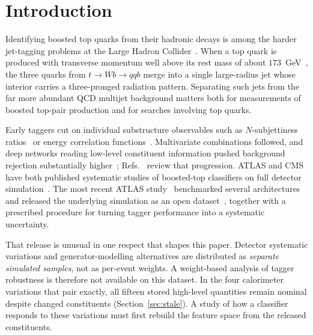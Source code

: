 \documentclass[pdflatex,sn-mathphys,Numbered,iicol]{sn-jnl}
\begin{document}
\maketitle

\section{Introduction}
\label{sec:intro}

Identifying boosted top quarks from their hadronic decays is among the harder
jet-tagging problems at the Large Hadron Collider~\cite{Evans2008}. When a top quark is
produced with transverse momentum well above its rest mass of about
$173$~GeV~\cite{PDG2024}, the three quarks from $t \to Wb \to qqb$ merge into a single
large-radius jet whose interior carries a three-pronged radiation pattern. Separating
such jets from the far more abundant QCD multijet background matters both for
measurements of boosted top-pair production and for searches involving top quarks.

Early taggers cut on individual substructure observables such as $N$-subjettiness
ratios~\cite{Thaler2011,Thaler2012} or energy correlation
functions~\cite{Larkoski2013}. Multivariate combinations followed, and deep networks
reading low-level constituent information pushed background rejection substantially
higher~\cite{Kasieczka2019,Qu2020,Komiske2019}; Refs.~\cite{Larkoski2020,Guest2018}
review that progression. ATLAS and CMS have both published systematic studies of
boosted-top classifiers on full detector simulation~\cite{ATLAS2024,CMS2020}. The most
recent ATLAS study~\cite{ATLAS2024} benchmarked several architectures and released the
underlying simulation as an open dataset~\cite{ATLASOpenData2024}, together with a
prescribed procedure for turning tagger performance into a systematic uncertainty.

That release is unusual in one respect that shapes this paper. Detector systematic
variations and generator-modelling alternatives are distributed as \emph{separate
simulated samples}, not as per-event weights. A weight-based analysis of tagger
robustness is therefore not available on this dataset. In the four calorimeter
variations that pair exactly, all fifteen stored high-level quantities remain
nominal despite changed constituents (Section~\ref{sec:stale}). A study of how
a classifier responds to these variations must first rebuild the feature space
from the released constituents.
\end{document}
